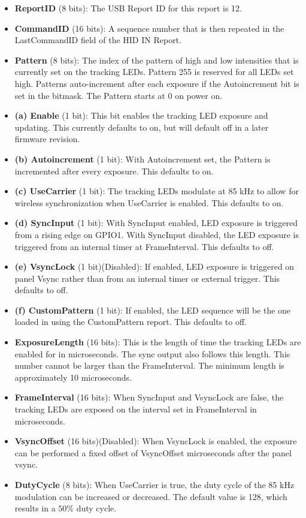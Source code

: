 \documentclass[letterpaper]{article}
\begin{document}
\begin{itemize}
  \item {\bfseries ReportID} (8 bits): The USB Report ID for this report is 12.
  \item {\bfseries CommandID} (16 bits): A sequence number that is then repeated in the LastCommandID field of the HID IN Report.
  \item {\bfseries Pattern} (8 bits): The index of the pattern of high and low intensities that is currently set on the tracking LEDs.  Pattern 255 is reserved for all LEDs set high.  Patterns auto-increment after each exposure if the Autoincrement bit is set in the bitmask.  The Pattern starts at 0 on power on.
  \item {\bfseries (a) Enable} (1 bit): This bit enables the tracking LED exposure and updating.  This currently defaults to on, but will default off in a later firmware revision.
  \item {\bfseries (b) Autoincrement} (1 bit): With Autoincrement set, the Pattern is incremented after every exposure.  This defaults to on.
  \item {\bfseries (c) UseCarrier} (1 bit): The tracking LEDs modulate at 85 kHz to allow for wireless synchronization when UseCarrier is enabled.  This defaults to on.
  \item {\bfseries (d) SyncInput} (1 bit): With SyncInput enabled, LED exposure is triggered from a rising edge on GPIO1.  With SyncInput disabled, the LED exposure is triggered from an internal timer at FrameInterval.  This defaults to off.
  \item {\bfseries (e) VsyncLock} (1 bit)(Disabled): If enabled, LED exposure is triggered on panel Vsync rather than from an internal timer or external trigger.  This defaults to off.
  \item {\bfseries (f) CustomPattern} (1 bit): If enabled, the LED sequence will be the one loaded in using the CustomPattern report.  This defaults to off.
  \item {\bfseries ExposureLength} (16 bits): This is the length of time the tracking LEDs are enabled for in microseconds.  The sync output also follows this length.  This number cannot be larger than the FrameInterval.  The minimum length is approximately 10 microseconds.
  \item {\bfseries FrameInterval} (16 bits): When SyncInput and VsyncLock are false, the tracking LEDs are exposed on the interval set in FrameInterval in microseconds.
  \item {\bfseries VsyncOffset} (16 bits)(Disabled): When VsyncLock is enabled, the exposure can be performed a fixed offset of VsyncOffset microseconds after the panel vsync.
  \item {\bfseries DutyCycle} (8 bits): When UseCarrier is true, the duty cycle of the 85 kHz modulation can be increased or decreased.  The default value is 128, which results in a $50\%$ duty cycle. 
\end{itemize}
\end{document}
